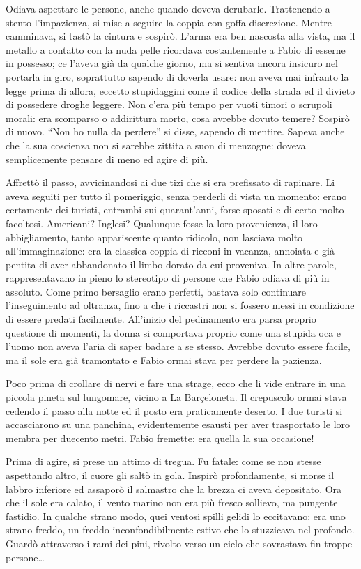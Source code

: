 Odiava aspettare le persone, anche quando doveva derubarle. Trattenendo a stento l'impazienza, si mise a seguire la coppia con goffa discrezione. Mentre camminava, si tastò la cintura e sospirò. L'arma era ben nascosta alla vista, ma il metallo a contatto con la nuda pelle ricordava costantemente a Fabio di esserne in possesso; ce l'aveva già da qualche giorno, ma si sentiva ancora insicuro nel portarla in giro, soprattutto sapendo di doverla usare: non aveva mai infranto la legge prima di allora, eccetto stupidaggini come il codice della strada ed il divieto di possedere droghe leggere. Non c'era più tempo per vuoti timori o scrupoli morali: era scomparso o addirittura morto, cosa avrebbe dovuto temere? Sospirò di nuovo. ``Non ho nulla da perdere'' si disse, sapendo di mentire. Sapeva anche che la sua coscienza non si sarebbe zittita a suon di menzogne: doveva semplicemente pensare di meno ed agire di più.

Affrettò il passo, avvicinandosi ai due tizi che si era prefissato di rapinare. Li aveva seguiti per tutto il pomeriggio, senza perderli di vista un momento: erano certamente dei turisti, entrambi sui quarant'anni, forse sposati e di certo molto facoltosi. Americani? Inglesi? Qualunque fosse la loro provenienza, il loro abbigliamento, tanto appariscente quanto ridicolo, non lasciava molto all'immaginazione: era la classica coppia di ricconi in vacanza, annoiata e già pentita di aver abbandonato il limbo dorato da cui proveniva. In altre parole, rappresentavano in pieno lo stereotipo di persone che Fabio odiava di più in assoluto. Come primo bersaglio erano perfetti, bastava solo continuare l'inseguimento ad oltranza, fino a che i riccastri non si fossero messi in condizione di essere predati facilmente. All'inizio del pedinamento era parsa proprio questione di momenti, la donna si comportava proprio come una stupida oca e l'uomo non aveva l'aria di saper badare a se stesso. Avrebbe dovuto essere facile, ma il sole era già tramontato e Fabio ormai stava per perdere la pazienza.

Poco prima di crollare di nervi e fare una strage, ecco che li vide entrare in una piccola pineta sul lungomare, vicino a La Barçeloneta. Il crepuscolo ormai stava cedendo il passo alla notte ed il posto era praticamente deserto. I due turisti si accasciarono su una panchina, evidentemente esausti per aver trasportato le loro membra per duecento metri. Fabio fremette: era quella la sua occasione!

Prima di agire, si prese un attimo di tregua. Fu fatale: come se non stesse aspettando altro, il cuore gli saltò in gola. Inspirò profondamente, si morse il labbro inferiore ed assaporò il salmastro che la brezza ci aveva depositato. Ora che il sole era calato, il vento marino non era più fresco sollievo, ma pungente fastidio. In qualche strano modo, quei ventosi spilli gelidi lo eccitavano: era uno strano freddo, un freddo inconfondibilmente estivo che lo stuzzicava nel profondo. Guardò attraverso i rami dei pini, rivolto verso un cielo che sovrastava fin troppe persone\ldots

